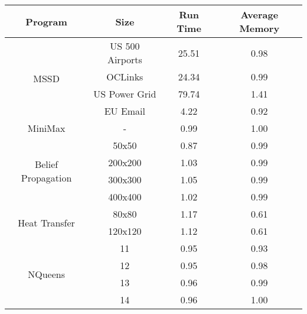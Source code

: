\begin{tabular}{c | c || c | c} \hline
	\textbf{Program} & \textbf{Size} & \textbf{Run Time} & \textbf{Average Memory}\\ \hline \hline
	\multirow{4}{*}{MSSD}  & US 500 Airports &  25.51  &  0.98
  \\
		 & OCLinks &  24.34  &  0.99
  \\
		 & US Power Grid &  79.74  &  1.41
  \\
		 & EU Email &  4.22  &  0.92
  \\
	\hline
	MiniMax  & - &  0.99  &  1.00
  \\
	\hline
	\multirow{4}{*}{Belief Propagation}  & 50x50 &  0.87  &  0.99
  \\
		 & 200x200 &  1.03  &  0.99
  \\
		 & 300x300 &  1.05  &  0.99
  \\
		 & 400x400 &  1.02  &  0.99
  \\
	\hline
	\multirow{2}{*}{Heat Transfer}  & 80x80 &  1.17  &  0.61
  \\
		 & 120x120 &  1.12  &  0.61
  \\
	\hline
	\multirow{4}{*}{NQueens}  & 11 &  0.95  &  0.93
  \\
		 & 12 &  0.95  &  0.98
  \\
		 & 13 &  0.96  &  0.99
  \\
		 & 14 &  0.96  &  1.00
  \\
	\hline
\end{tabular}
